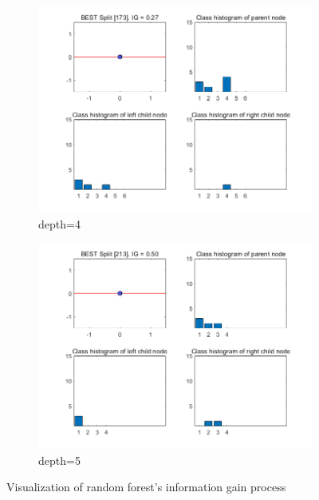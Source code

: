 \begin{figure}[htbp]
	\vspace{0.5cm} %
	\begin{subfigure}{0.33\linewidth}
		\centering
		\includegraphics[width=\linewidth]{image/q2-infgain/fig4.png}
		\caption{depth=4}
	\end{subfigure}
	\hspace{0.5cm} %
	\begin{subfigure}{0.33\linewidth}
		\centering
		\includegraphics[width=\linewidth]{image/q2-infgain/fig5.png}
		\caption{depth=5}
	\end{subfigure}
	\caption{Visualization of random forest's information gain process}
	\label{fig:app-q2-infgain}
\end{figure}


